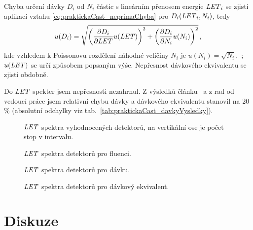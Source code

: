 Chyba určení dávky $D_i$ od $N_i$ částic s lineárním přenosem energie $\mathit{LET}_i$ se zjistí aplikací vztahu \eqref{eq:praktickaCast_neprimaChyba} pro $D_i(\mathit{LET}_i,N_i)$, tedy 
\begin{equation}
  u(D_i)=\sqrt{\left(\frac{\partial D_i}{\partial\mathit{LET}}u(\mathit{LET})\right)^2+\left(\frac{\partial D_i}{\partial N_i}u(N_i)\right)^2}\,,
  \label{eq:praktickaCast_chybaDavka}
\end{equation}
kde vzhledem k Poissonovu rozdělení náhodné veličiny $N_i$ je $u(N_i)=\sqrt{N_i}$,~\cite{thesisKPBrabcova}; $u(\mathit{LET})$ se určí způsobem popsaným výše. Nepřesnost dávkového ekvivalentu se zjistí obdobně.

Do $\mathit{LET}$ spekter jsem nepřesnosti nezahrnul. Z výsledků článku~\cite{nejistoty} a z rad od vedoucí práce jsem relativní chybu dávky a dávkového ekvivalentu stanovil na 20 \% (absolutní odchylky viz tab.~\ref{tab:praktickaCast_davkyVysledky}).
\begin{figure}[H]
  \centering
	\centering
	
	\caption{$\mathit{LET}$ spektra vyhodnocených detektorů, na vertikální ose je počet stop v intervalu.}
	\label{fig:praktickaCast_LETcetnost}
\end{figure}
\begin{figure}[H]
  \centering
	\centering
	
	\caption{$\mathit{LET}$ spektra detektorů pro fluenci.}
	\label{fig:praktickaCast_LETfluence}
\end{figure}
\begin{figure}[H]
  \centering
	\centering
	
	\caption{$\mathit{LET}$ spektra detektorů pro dávku.}
	\label{fig:praktickaCast_LETdavka}
\end{figure}
\begin{figure}[H]
  \centering
	\centering
	
	\caption{$\mathit{LET}$ spektra detektorů pro dávkový ekvivalent.}
	\label{fig:praktickaCast_LETdavkEkvivalent}
\end{figure}
\newpage
\section{Diskuze}
